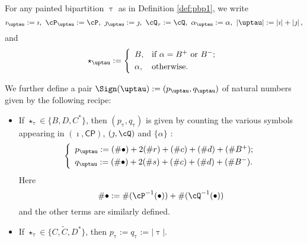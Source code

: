 \documentclass[12pt]{amsart}
\def\abs#1{\left|{#1}\right|}
\newcommand{\CP}{{\mathcal {P}}}
\newcommand{\CQ}{{\mathcal {Q}}}
\numberwithin{equation}{section}
\theoremstyle{remark}
\newtheorem{remark}[thm]{Remark}
\def\CP{\mathsf{CP}}
\def\CQ{\overline{\sfA}}%
\begin{document}

For any painted bipartition $\uptau$ as in Definition \ref{def:pbp1}, we write
\[
  \imath_\uptau:=\imath,\ \cP_\uptau:=\cP,\ \jmath_\uptau:=\jmath,\ \cQ_\tau:=\cQ,\ \alpha_\uptau:=\alpha,\ \abs{\uptau}:=\abs{\imath}+\abs{\jmath},
\]
and
\[
  \star_\uptau:= \left\{
    \begin{array}{ll}
      B, &\hbox{if $\alpha=B^+$ or $B^-$}; \smallskip\\
      \alpha, & \hbox{otherwise}.           \end{array}
  \right.
\]

We further define a pair $\Sign(\uptau):=(p_{\uptau}, q_{\uptau})$ of natural numbers given by the
following recipe:
\begin{itemize}
  \item If $\star_\uptau\in \{B, D, C^*\}$, then $(p_\uptau, q_\uptau)$ is given by
        counting the various symbols appearing in $(\imath, \CP)$,
        $(\jmath, \cQ)$ and $\{\alpha\}$ :
        \begin{equation}\label{ptqt}
          \left\{
            \begin{array}{l}
              p_\uptau :=( \# \bullet)+ 2 (\# r) +(\# c )+ (\# d) + (\# B^+);\smallskip\\
              q_\uptau :=( \# \bullet)+ 2 (\# s) + (\# c) + (\# d) + (\# B^-).\\
            \end{array}
          \right.
        \end{equation}
        Here
        \[
        \#\bullet:=\#(\cP^{-1}(\bullet))+\#(\cQ^{-1}(\bullet))
        \]
        and the other terms are similarly defined.
  \item If $\star_\uptau\in \{C, \widetilde C, D^*\}$, then
        $p_\uptau:=q_\uptau:=\abs{\uptau}$.
\end{itemize}
\smallskip
\end{document}
